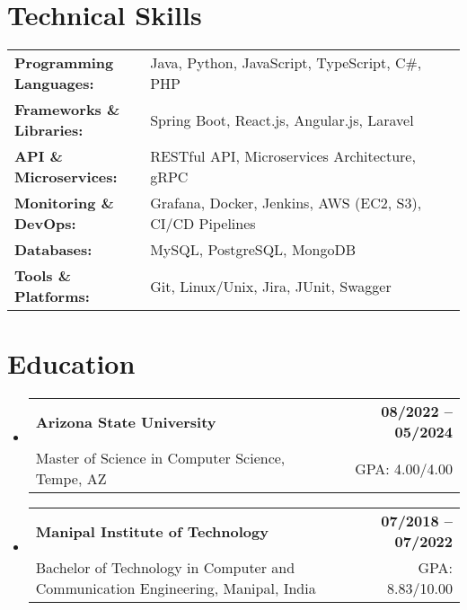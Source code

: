 \documentclass[letterpaper,11pt]{article}
\makeatletter
\newcommand{\educationSubheading}[4]{
  \vspace{-2pt}\item
    \begin{tabular*}{1.0\textwidth}[t]{l@{\extracolsep{\fill}}r}
      \textbf{\small #1} & \textbf{\small #2} \\
      {\small#3} & {\small #4} \\
    \end{tabular*}\vspace{-7pt}
}
\newcommand{\resumeSubHeadingListStart}{\begin{itemize}[leftmargin=0pt, label={}]}
\newcommand{\resumeSubHeadingListEnd}{\end{itemize}}
\makeatother
\begin{document}
\section{Technical Skills}
        \vspace{-14pt}
        \begin{table}[h]
            \footnotesize
            \begin{tabular}{p{0.3\linewidth} p{0.7\linewidth}}
                \textbf{Programming Languages:} & Java, Python, JavaScript, TypeScript, C\#, PHP \\
                \textbf{Frameworks \& Libraries:} & Spring Boot, React.js, Angular.js, Laravel \\
                \textbf{API \& Microservices:} & RESTful API, Microservices Architecture, gRPC \\
                \textbf{Monitoring \& DevOps:} & Grafana, Docker, Jenkins, AWS (EC2, S3), CI/CD Pipelines \\
                \textbf{Databases:} & MySQL, PostgreSQL, MongoDB \\
                \textbf{Tools \& Platforms:} & Git, Linux/Unix, Jira, JUnit, Swagger \\
            \end{tabular}
        \end{table}

 \vspace{-15pt}

\section{Education}
  \resumeSubHeadingListStart
    \educationSubheading
      {Arizona State University}{08/2022 -- 05/2024}
      {Master of Science in Computer Science, Tempe, AZ}{GPA: 4.00/4.00}

    \educationSubheading
      {Manipal Institute of Technology}{07/2018 -- 07/2022}
      {Bachelor of Technology in Computer and Communication Engineering, Manipal, India}{GPA: 8.83/10.00}
  \resumeSubHeadingListEnd
\end{document}
